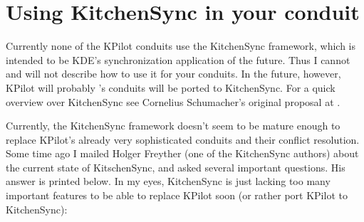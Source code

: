 \documentclass[10pt,a4paper]{article}
\begin{document}
\section{Using KitchenSync in your conduit} \label{SectionKitchenSync}

Currently none of the KPilot conduits use the KitchenSync framework, which 
is intended to be KDE's synchronization application of the future. Thus I cannot and will not 
describe how to use it for your conduits. In the future, however, 
KPilot will probably 's conduits will be ported to KitchenSync. For a quick overview over 
KitchenSync see Cornelius Schumacher's original proposal at .

Currently, the KitchenSync framework doesn't seem to be mature enough to replace KPilot's already very sophisticated conduits and their conflict resolution. 
Some time ago I mailed Holger Freyther (one of the KitchenSync authors) about the current state of KitschenSync, and asked several important questions. His answer is printed below. In my eyes, KitchenSync is just lacking too many important features to be able to replace KPilot soon (or rather port KPilot to KitchenSync):
\end{document}

